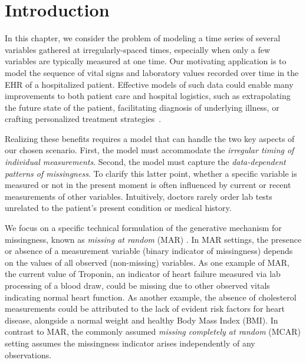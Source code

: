 \section{Introduction}
In this chapter, we consider the problem of modeling a time series of several variables gathered at irregularly-spaced times, especially when only a few variables are typically measured at one time. Our motivating application is to model the sequence of vital signs and laboratory values recorded over time in the EHR of a hospitalized patient. Effective models of such data could enable many improvements to both patient care and hospital logistics, such as extrapolating the future state of the patient, facilitating diagnosis of underlying illness, or crafting personalized treatment strategies~\citep{hyland2020early, bica2021real}. 

Realizing these benefits requires a model that can handle the two key aspects of our chosen scenario. First, the model must accommodate the \emph{irregular timing of individual measurements}. Second, the model must capture the \emph{data-dependent patterns of missingness}. To clarify this latter point, whether a specific variable is measured or not in the present moment is often influenced by current or recent measurements of other variables. Intuitively, doctors rarely order lab tests unrelated to the patient's present condition or medical history.

We focus on a specific technical formulation of the generative mechanism for missingness, known as \emph{missing at random} (MAR) \citep{rubin1976inference}. In MAR settings, the presence or absence of a measurement variable (binary indicator of missingness) depends on the values of all observed (non-missing) variables. As one example of MAR, the current value of Troponin, an indicator of heart failure measured via lab processing of a blood draw, could be missing due to other observed vitals indicating normal heart function. As another example, the absence of cholesterol measurements could be attributed to the lack of evident risk factors for heart disease, alongside a normal weight and healthy Body Mass Index (BMI). In contrast to MAR, the  commonly assumed \emph{missing completely at random} (MCAR) setting assumes the missingness indicator arises independently of any observations.

